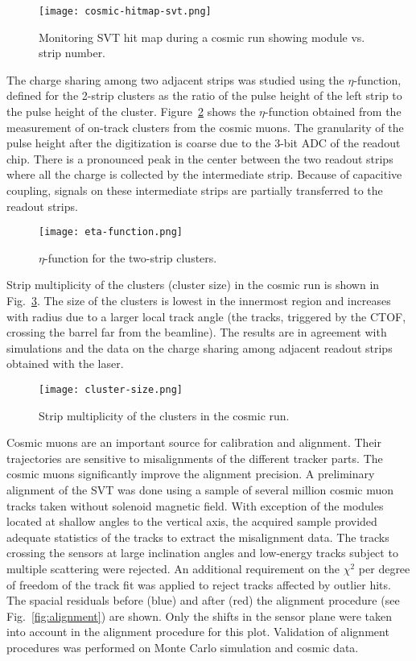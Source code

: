 \begin{figure}[hbt] 
\centering 
\texttt{[image: cosmic-hitmap-svt.png]}
\caption{Monitoring SVT hit map during a cosmic run showing module vs. strip number.}
\label{fig:cosmic-hitmap-svt}
\end{figure}

The charge sharing among two adjacent strips was studied using the $\eta$-function, defined for the 2-strip clusters as the ratio of the pulse height of the left strip to the pulse height of the cluster. Figure~\ref{fig:eta-function} shows the  $\eta$-function obtained from the measurement of on-track clusters from the cosmic muons. The granularity of the pulse height after the digitization is coarse due to the 3-bit ADC of the readout chip. There is a pronounced peak in the center between the two readout strips where all the charge is collected by the intermediate strip. Because of capacitive coupling, signals on these intermediate strips are partially transferred to the readout strips.

\begin{figure}[hbt] 
\centering 
\texttt{[image: eta-function.png]}
\caption{$\eta$-function for the two-strip clusters.}
\label{fig:eta-function}
\end{figure}

Strip multiplicity of the clusters (cluster size) in the cosmic run is shown in Fig.~\ref{fig:cluster-size}. The size of the clusters is lowest in the innermost region and increases with radius due to a larger local track angle (the tracks, triggered by the CTOF, crossing the barrel far from the beamline). The results are in agreement with simulations and the data on the charge sharing among adjacent readout strips obtained with the laser.

\begin{figure}[hbt] 
\centering 
\texttt{[image: cluster-size.png]}
\caption{Strip multiplicity of the clusters in the cosmic run.}
\label{fig:cluster-size}
\end{figure}

Cosmic muons are an important source for calibration and alignment. Their trajectories are sensitive to misalignments of the different tracker parts. The cosmic muons significantly improve the alignment precision. A preliminary alignment of the SVT was done using a sample of several million cosmic muon tracks taken without solenoid magnetic field. With exception of the modules located at shallow angles to the vertical axis, the acquired sample provided adequate statistics of the tracks to extract the misalignment data. The tracks crossing the sensors at large inclination angles and low-energy tracks subject to multiple scattering were rejected. An additional requirement on the $\chi^2$ per degree of freedom of the track fit was applied to reject tracks affected by outlier hits. The spacial residuals before (blue) and after (red) the alignment procedure (see Fig.~\ref{fig:alignment}) are shown. Only the shifts in the sensor plane were taken into account in the alignment procedure for this plot. Validation of alignment procedures was performed on Monte Carlo simulation and cosmic data.

